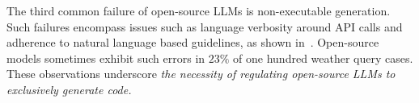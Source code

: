 
The third common failure of open-source LLMs is non-executable generation. Such failures encompass issues such as language verbosity around API calls and adherence to natural language based guidelines, as shown in~. Open-source models sometimes exhibit such errors in $23\%$ of one hundred weather query cases.
These observations underscore \emph{the necessity of regulating open-source LLMs to exclusively generate code.}









